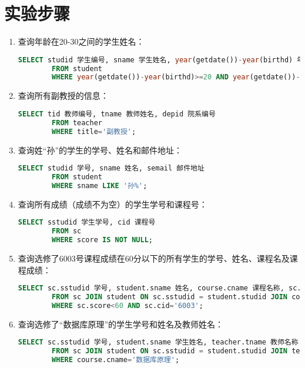 \documentclass[a4paper]{uestcreport}
\begin{document}
\section{实验步骤}
\begin{enumerate}
    \item 查询年龄在20-30之间的学生姓名：
          \begin{lstlisting}[language=SQL]
        SELECT studid 学生编号, sname 学生姓名, year(getdate())-year(birthd) 年龄
        FROM student
        WHERE year(getdate())-year(birthd)>=20 AND year(getdate())-year(birthd)<=30;
    \end{lstlisting}
    \item 查询所有副教授的信息：
          \begin{lstlisting}[language=SQL]
        SELECT tid 教师编号, tname 教师姓名, depid 院系编号
        FROM teacher
        WHERE title='副教授';
    \end{lstlisting}
    \item 查询姓“孙”的学生的学号、姓名和邮件地址：
          \begin{lstlisting}[language=SQL]
        SELECT studid 学号, sname 姓名, semail 邮件地址
        FROM student
        WHERE sname LIKE '孙%';
    \end{lstlisting}
    \item 查询所有成绩（成绩不为空）的学生学号和课程号：
          \begin{lstlisting}[language=SQL]
        SELECT sstudid 学生学号, cid 课程号
        FROM sc
        WHERE score IS NOT NULL;
    \end{lstlisting}
    \item 查询选修了6003号课程成绩在60分以下的所有学生的学号、姓名、课程名及课程成绩：
          \begin{lstlisting}[language=SQL]
        SELECT sc.sstudid 学号, student.sname 姓名, course.cname 课程名称, sc.score 课程成绩
        FROM sc JOIN student ON sc.sstudid = student.studid JOIN course ON sc.cid = course.cid
        WHERE sc.score<60 AND sc.cid='6003';
    \end{lstlisting}
    \item 查询选修了“数据库原理”的学生学号和姓名及教师姓名：
          \begin{lstlisting}[language=SQL]
        SELECT sc.sstudid 学号, student.sname 学生姓名, teacher.tname 教师名称
        FROM sc JOIN student ON sc.sstudid = student.studid JOIN teacher ON sc.tid=teacher.tid JOIN course ON sc.cid = course.cid
        WHERE course.cname='数据库原理';
    \end{lstlisting}
\end{enumerate}
\end{document}
